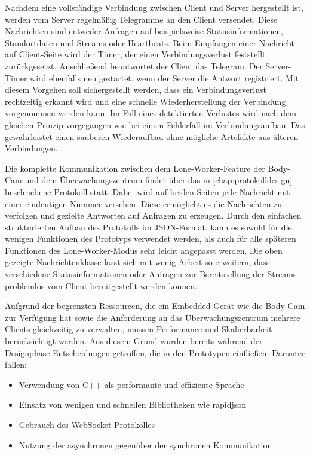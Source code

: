 \documentclass[thesis.tex]{subfiles}
\begin{document}
Nachdem eine vollständige Verbindung zwischen Client und Server hergestellt ist, werden vom Server regelmäßig Telegramme an den Client versendet.
Diese Nachrichten sind entweder Anfragen auf beispielsweise Statusinformationen, Standortdaten und Streams oder Heartbeats.
Beim Empfangen einer Nachricht auf Client-Seite wird der Timer, der einen Verbindungsverlust feststellt zurückgesetzt.
Anschließend beantwortet der Client das Telegram.
Der Server-Timer wird ebenfalls neu gestartet, wenn der Server die Antwort registriert.
Mit diesem Vorgehen soll sichergestellt werden, dass ein Verbindungsverlust rechtzeitig erkannt wird und eine schnelle Wiederherstellung der Verbindung vorgenommen werden kann.
Im Fall eines detektierten Verlustes wird nach dem gleichen Prinzip vorgegangen wie bei einem Fehlerfall im Verbindungsaufbau.
Das gewährleistet einen sauberen Wiederaufbau ohne mögliche Artefakte aus älteren Verbindungen.

Die komplette Kommunikation zwischen dem Lone-Worker-Feature der Body-Cam und dem Überwachungszentrum findet über das in \autoref{chap:protokolldesign} beschriebene Protokoll statt.
Dabei wird auf beiden Seiten jede Nachricht mit einer eindeutigen Nummer versehen.
Diese ermöglicht es die Nachrichten zu verfolgen und gezielte Antworten auf Anfragen zu erzeugen.
Durch den einfachen strukturierten Aufbau des Protokolls im JSON-Format, kann es sowohl für die wenigen Funktionen des Prototyps verwendet werden, als auch für alle späteren Funktionen des Lone-Worker-Modus sehr leicht angepasst werden.
Die oben gezeigte Nachrichtenklasse lässt sich mit wenig Arbeit so erweitern, dass verschiedene Statusinformationen oder Anfragen zur Bereitstellung der Streams problemlos vom Client bereitgestellt werden können.


Aufgrund der begrenzten Ressourcen, die ein Embedded-Gerät wie die Body-Cam zur Verfügung hat sowie die Anforderung an das Überwachungszentrum mehrere Clients gleichzeitig zu verwalten, müssen Performance und Skalierbarkeit berücksichtigt werden.
Aus diesem Grund wurden bereits während der Designphase Entscheidungen getroffen, die in den Prototypen einfließen.
Darunter fallen:
\begin{itemize}
    \item Verwendung von C++ als performante und effiziente Sprache
    \item Einsatz von wenigen und schnellen Bibliotheken wie \glqq rapidjson\grqq{}
    \item Gebrauch des WebSocket-Protokolles
    \item Nutzung der asynchronen gegenüber der synchronen Kommunikation
\end{itemize}
\end{document}

